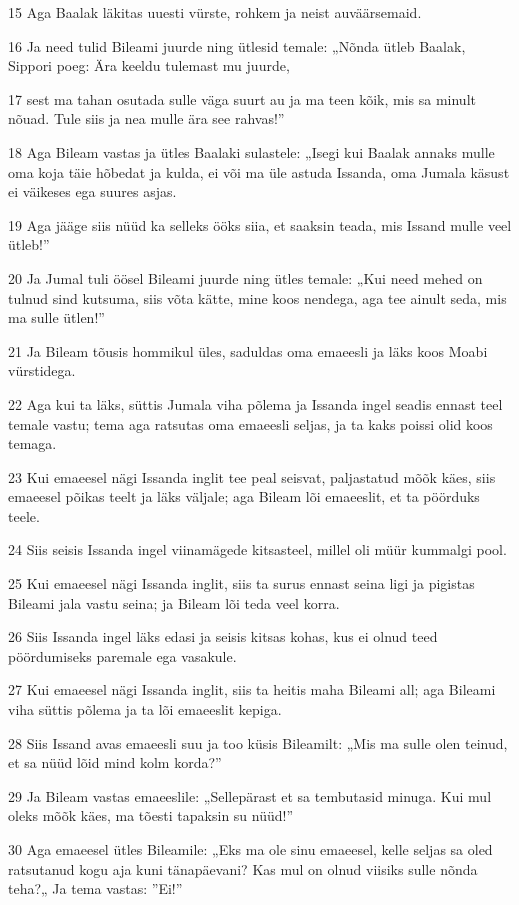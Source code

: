 \par 15 Aga Baalak läkitas uuesti vürste, rohkem ja neist auväärsemaid.
\par 16 Ja need tulid Bileami juurde ning ütlesid temale: „Nõnda ütleb Baalak, Sippori poeg: Ära keeldu tulemast mu juurde,
\par 17 sest ma tahan osutada sulle väga suurt au ja ma teen kõik, mis sa minult nõuad. Tule siis ja nea mulle ära see rahvas!”
\par 18 Aga Bileam vastas ja ütles Baalaki sulastele: „Isegi kui Baalak annaks mulle oma koja täie hõbedat ja kulda, ei või ma üle astuda Issanda, oma Jumala käsust ei väikeses ega suures asjas.
\par 19 Aga jääge siis nüüd ka selleks ööks siia, et saaksin teada, mis Issand mulle veel ütleb!”
\par 20 Ja Jumal tuli öösel Bileami juurde ning ütles temale: „Kui need mehed on tulnud sind kutsuma, siis võta kätte, mine koos nendega, aga tee ainult seda, mis ma sulle ütlen!”
\par 21 Ja Bileam tõusis hommikul üles, saduldas oma emaeesli ja läks koos Moabi vürstidega.
\par 22 Aga kui ta läks, süttis Jumala viha põlema ja Issanda ingel seadis ennast teel temale vastu; tema aga ratsutas oma emaeesli seljas, ja ta kaks poissi olid koos temaga.
\par 23 Kui emaeesel nägi Issanda inglit tee peal seisvat, paljastatud mõõk käes, siis emaeesel põikas teelt ja läks väljale; aga Bileam lõi emaeeslit, et ta pöörduks teele.
\par 24 Siis seisis Issanda ingel viinamägede kitsasteel, millel oli müür kummalgi pool.
\par 25 Kui emaeesel nägi Issanda inglit, siis ta surus ennast seina ligi ja pigistas Bileami jala vastu seina; ja Bileam lõi teda veel korra.
\par 26 Siis Issanda ingel läks edasi ja seisis kitsas kohas, kus ei olnud teed pöördumiseks paremale ega vasakule.
\par 27 Kui emaeesel nägi Issanda inglit, siis ta heitis maha Bileami all; aga Bileami viha süttis põlema ja ta lõi emaeeslit kepiga.
\par 28 Siis Issand avas emaeesli suu ja too küsis Bileamilt: „Mis ma sulle olen teinud, et sa nüüd lõid mind kolm korda?”
\par 29 Ja Bileam vastas emaeeslile: „Sellepärast et sa tembutasid minuga. Kui mul oleks mõõk käes, ma tõesti tapaksin su nüüd!”
\par 30 Aga emaeesel ütles Bileamile: „Eks ma ole sinu emaeesel, kelle seljas sa oled ratsutanud kogu aja kuni tänapäevani? Kas mul on olnud viisiks sulle nõnda teha?„ Ja tema vastas: ”Ei!”
